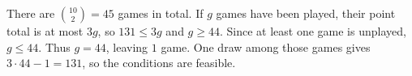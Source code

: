 There are $\binom{10}{2}=45$ games in total. If $g$ games have been played, their point total is at most $3g$, so $131\le3g$ and $g\ge44$. Since at least one game is unplayed, $g\le44$. Thus $g=44$, leaving $\boxed1$ game. One draw among those games gives $3\cdot44-1=131$, so the conditions are feasible.
